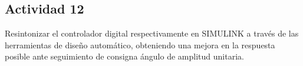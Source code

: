 \newpage
\subsection{Actividad 12}
Resintonizar el controlador digital respectivamente en
\textsc{SIMULINK} a través de las herramientas de diseño automático,
obteniendo una mejora en la respuesta posible ante seguimiento de
consigna ángulo de amplitud unitaria.

\begin{tcolorbox}[sharp corners, colframe=bluebox, title= Simulink]
\vspace*{0.5em}
  \end{tcolorbox}%